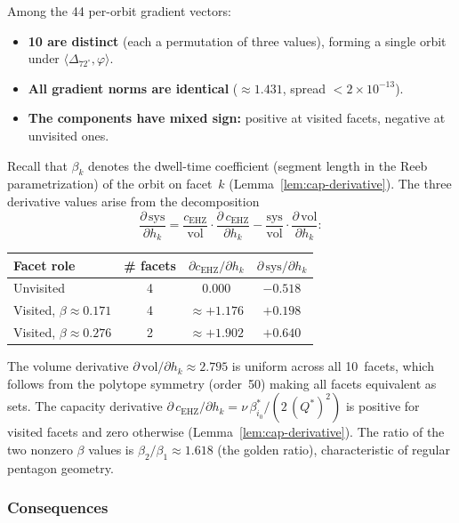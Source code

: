 Among the 44 per-orbit gradient vectors:
\begin{itemize}
\item \textbf{10 are distinct}
  (each a permutation of three values),
  forming a single orbit under
  $\langle \Delta_{72^\circ}, \varphi \rangle$.
\item \textbf{All gradient norms are identical}
  ($\approx 1.431$, spread $< 2 \times 10^{-13}$).
\item \textbf{The components have mixed sign:}
  positive at visited facets, negative at unvisited ones.
\end{itemize}

Recall that $\beta_k$ denotes the dwell-time coefficient
(segment length in the Reeb parametrization) of the orbit on
facet~$k$ (Lemma~\ref{lem:cap-derivative}).
The three derivative values arise from the decomposition
\[
  \frac{\partial\,\mathrm{sys}}{\partial h_k}
  = \frac{c_{\mathrm{EHZ}}}{\mathrm{vol}} \cdot
    \frac{\partial\,c_{\mathrm{EHZ}}}{\partial h_k}
  - \frac{\mathrm{sys}}{\mathrm{vol}} \cdot
    \frac{\partial\,\mathrm{vol}}{\partial h_k}:
\]
\begin{center}
\begin{tabular}{lccc}
\toprule
Facet role & \# facets &
$\partial c_{\mathrm{EHZ}} / \partial h_k$ &
$\partial\,\mathrm{sys}/\partial h_k$ \\
\midrule
Unvisited & 4 & $0.000$ & $-0.518$ \\
Visited, $\beta \approx 0.171$ & 4 & $\approx {+1.176}$ & $+0.198$ \\
Visited, $\beta \approx 0.276$ & 2 & $\approx {+1.902}$ & $+0.640$ \\
\bottomrule
\end{tabular}
\end{center}

The volume derivative $\partial\,\mathrm{vol}/\partial h_k \approx 2.795$ is
uniform across all 10~facets,
which follows from the polytope symmetry (order~50) making all
facets equivalent as sets.
The capacity derivative
$\partial\,c_{\mathrm{EHZ}}/\partial h_k
= \nu\,\beta_{i_0}^* / (2\,(Q^*)^2)$
is positive for visited facets and zero otherwise
(Lemma~\ref{lem:cap-derivative}).
The ratio of the two nonzero $\beta$ values is
$\beta_2 / \beta_1 \approx 1.618$ (the golden ratio),
characteristic of regular pentagon geometry.

\subsubsection*{Consequences}

